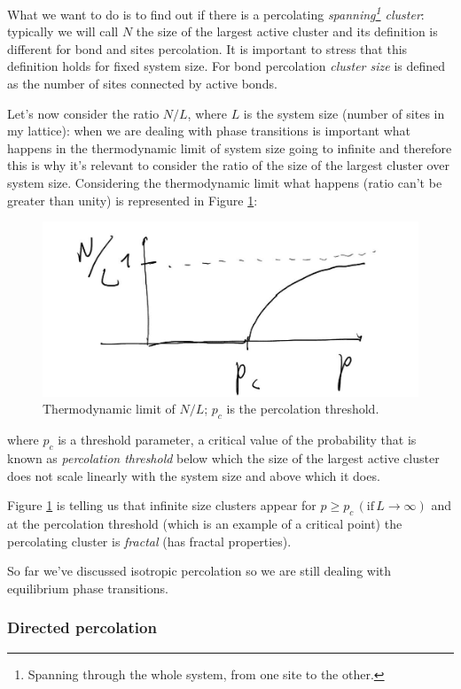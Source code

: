 \documentclass[\main/main.tex]{subfiles}
\begin{document}
What we want to do is to find out if there is a percolating \textit{spanning\footnote{Spanning through the whole system, from one site to the other.} cluster}: typically we will call $N$ the size of the largest active cluster and its definition is different for bond and sites percolation. It is important to stress that this definition holds for fixed system size. For bond percolation \textit{cluster size } is defined as the number of sites connected by active bonds.

Let's now consider the ratio $N/L$, where $L$ is the system size (number of sites in my lattice): when we are dealing with phase transitions is important what happens in the thermodynamic limit of system size going to infinite and therefore this is why it's relevant to consider the ratio of the size of the largest cluster over system size. Considering the thermodynamic limit what happens (ratio can't be greater than unity) is represented in Figure \ref{fig:ratio}:

\begin{figure}[ht]
    \centering
    \includegraphics[width=0.8\linewidth]{Lectures/Images/limit.jpg}
    \caption{Thermodynamic limit of $N/L$; $p_c$ is the percolation threshold.}
    \label{fig:ratio}
\end{figure}

where $p_c$ is a threshold parameter, a critical value of the probability that is known as \textit{percolation threshold} below which the size of the largest active cluster does not scale linearly with the system size and above which it does.

Figure \ref{fig:ratio} is telling us that infinite size clusters appear for $p\geq p_c \,(\text{if}\, L\to\infty)$ and at the percolation threshold (which is an example of a critical point) the percolating cluster is \textit{fractal} (has fractal properties).

So far we've discussed isotropic percolation so we are still dealing with equilibrium phase transitions.

\subsubsection{Directed percolation}
\end{document}
